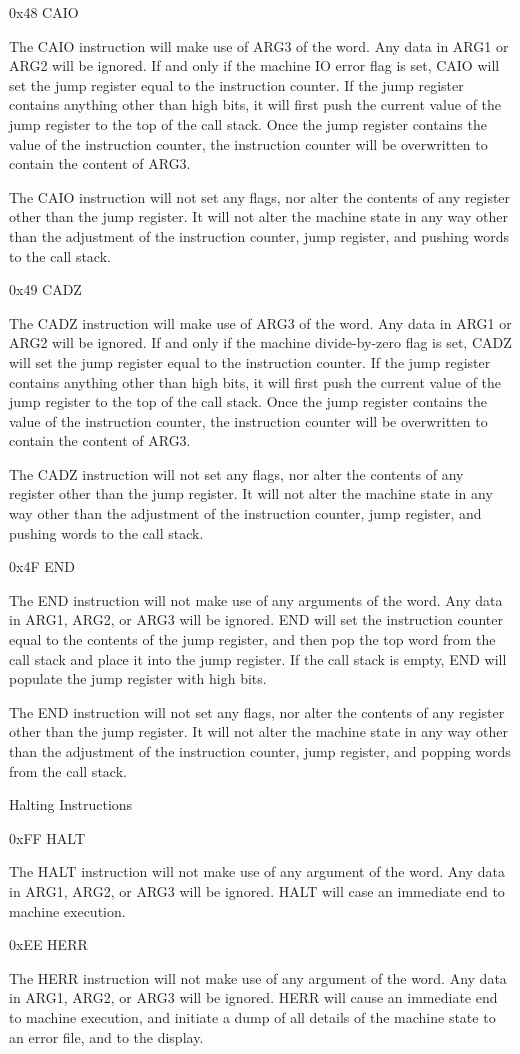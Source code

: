 \documentclass[]{article}
\begin{document}
0x48 CAIO

The CAIO instruction will make use of ARG3 of the word. Any data in ARG1
or ARG2 will be ignored. If and only if the machine IO error flag is
set, CAIO will set the jump register equal to the instruction counter.
If the jump register contains anything other than high bits, it will
first push the current value of the jump register to the top of the call
stack. Once the jump register contains the value of the instruction
counter, the instruction counter will be overwritten to contain the
content of ARG3.

The CAIO instruction will not set any flags, nor alter the contents of
any register other than the jump register. It will not alter the machine
state in any way other than the adjustment of the instruction counter,
jump register, and pushing words to the call stack.

0x49 CADZ

The CADZ instruction will make use of ARG3 of the word. Any data in ARG1
or ARG2 will be ignored. If and only if the machine divide-by-zero flag
is set, CADZ will set the jump register equal to the instruction
counter. If the jump register contains anything other than high bits, it
will first push the current value of the jump register to the top of the
call stack. Once the jump register contains the value of the instruction
counter, the instruction counter will be overwritten to contain the
content of ARG3.

The CADZ instruction will not set any flags, nor alter the contents of
any register other than the jump register. It will not alter the machine
state in any way other than the adjustment of the instruction counter,
jump register, and pushing words to the call stack.

0x4F END

The END instruction will not make use of any arguments of the word. Any
data in ARG1, ARG2, or ARG3 will be ignored. END will set the
instruction counter equal to the contents of the jump register, and then
pop the top word from the call stack and place it into the jump
register. If the call stack is empty, END will populate the jump
register with high bits.

The END instruction will not set any flags, nor alter the contents of
any register other than the jump register. It will not alter the machine
state in any way other than the adjustment of the instruction counter,
jump register, and popping words from the call stack.

Halting Instructions

0xFF HALT

The HALT instruction will not make use of any argument of the word. Any
data in ARG1, ARG2, or ARG3 will be ignored. HALT will case an immediate
end to machine execution.

0xEE HERR

The HERR instruction will not make use of any argument of the word. Any
data in ARG1, ARG2, or ARG3 will be ignored. HERR will cause an
immediate end to machine execution, and initiate a dump of all details
of the machine state to an error file, and to the display.
\end{document}
